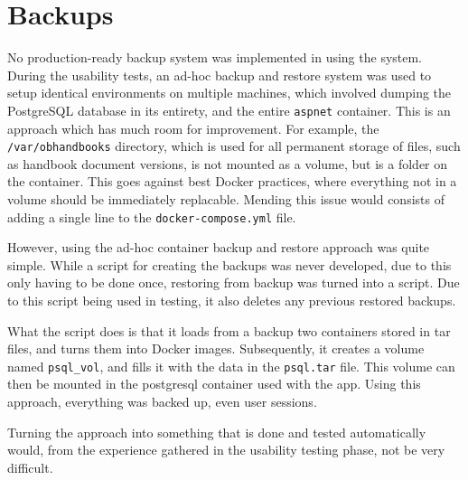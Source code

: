 \section{Backups}
No production-ready backup system was implemented in using the system.
During the usability tests, an ad-hoc backup and restore system was used to setup identical environments on multiple machines, which involved dumping the PostgreSQL database in its entirety, and the entire \texttt{aspnet} container.
This is an approach which has much room for improvement.
For example, the \texttt{/var/obhandbooks} directory, which is used for all permanent storage of files, such as handbook document versions, is not mounted as a volume, but is a folder on the container.
This goes against best Docker practices, where everything not in a volume should be immediately replacable.
Mending this issue would consists of adding a single line to the \texttt{docker-compose.yml} file.

However, using the ad-hoc container backup and restore approach was quite simple.
While a script for creating the backups was never developed, due to this only having to be done once, restoring from backup was turned into a script.
Due to this script being used in testing, it also deletes any previous restored backups.

What the script does is that it loads from a backup two containers stored in tar files, and turns them into Docker images.
Subsequently, it creates a volume named \texttt{psql_vol}, and fills it with the data in the \texttt{psql.tar} file.
This volume can then be mounted in the postgresql container used with the app.
Using this approach, everything was backed up, even user sessions.

Turning the approach into something that is done and tested automatically would, from the experience gathered in the usability testing phase, not be very difficult.
